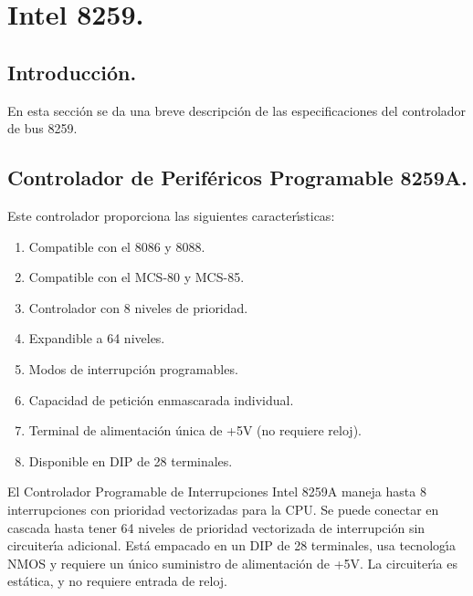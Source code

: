 \section{Intel 8259.}
\label{Section:8259}


\subsection{Introducci\'on.}
\label{Subsection:intro8259}

En esta secci\'on se da una breve descripci\'on de las especificaciones del controlador de bus %
8259.


\subsection{Controlador de Perif\'ericos Programable 8259A.}
\label{Subsection:pic9259}

Este controlador proporciona las siguientes caracter\'{\i}sticas:

\begin{enumerate}
\item Compatible con el 8086 y 8088.
\item Compatible con el MCS-80 y MCS-85.
\item Controlador con 8 niveles de prioridad.
\item Expandible a 64 niveles.
\item Modos de interrupci\'on programables.
\item Capacidad de petici\'on enmascarada individual.
\item Terminal de alimentaci\'on \'unica de +5V (no requiere reloj).
\item Disponible en DIP de 28 terminales.
\end{enumerate}

El Controlador Programable de Interrupciones Intel 8259A maneja hasta 8 interrupciones con %
prioridad vectorizadas para la CPU. Se puede conectar en cascada hasta tener 64 niveles de %
prioridad vectorizada de interrupci\'on sin circuiter\'{\i}a adicional. Est\'a empacado en un %
DIP de 28 terminales, usa tecnolog\'{\i}a NMOS y requiere un \'unico suministro de %
alimentaci\'on de +5V. La circuiter\'{\i}a es est\'atica, y no requiere entrada de reloj.

